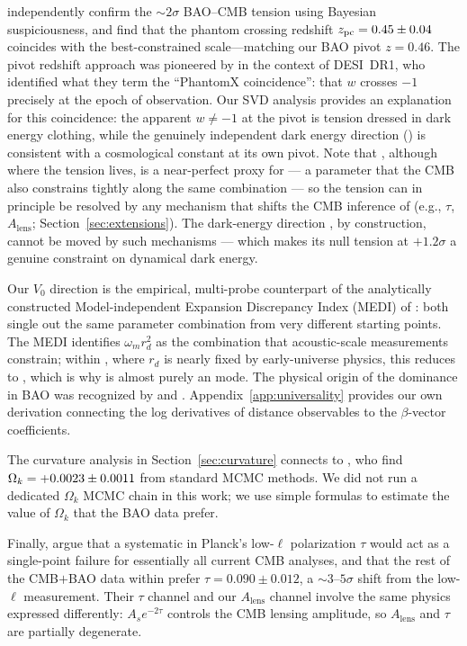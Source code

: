  
\citet{Ye2025} independently confirm the ${\sim}2\sigma$ BAO--CMB tension using Bayesian suspiciousness, and find that the phantom crossing redshift $z_{\rm pc} = 0.45 \pm 0.04$ coincides with the best-constrained scale---matching our BAO \cone pivot $z = 0.46$. The pivot redshift approach was pioneered by \citet{CortesLiddle2024} in the context of DESI~DR1, who identified what they term the ``PhantomX coincidence'': that $w$ crosses $-1$ precisely at the epoch of observation. Our SVD analysis provides an explanation for this coincidence: the apparent $w \neq -1$ at the \czero pivot is \omh tension dressed in dark energy clothing, while the genuinely independent dark energy direction (\cone) is consistent with a cosmological constant at its own pivot. Note that \czero, although where the tension lives, is a near-perfect proxy for \omh --- a parameter that the CMB also constrains tightly along the same combination --- so the tension can in principle be resolved by any mechanism that shifts the CMB inference of \omh (e.g., $\tau$, $A_\mathrm{lens}$; Section~\ref{sec:extensions}). The dark-energy direction \cone, by construction, cannot be moved by such mechanisms --- which makes its null tension at $+1.2\sigma$ a genuine constraint on dynamical dark energy.

Our $V_0$ direction is the empirical, multi-probe counterpart of the analytically constructed Model-independent Expansion Discrepancy Index (MEDI) of \citet{Weiner2026_MEDI}: both single out the same parameter combination from very different starting points. The MEDI identifies $\omega_m r_d^2$ as the combination that acoustic-scale measurements constrain; within \LCDM, where $r_d$ is nearly fixed by early-universe physics, this reduces to \omh, which is why \czero is almost purely an \omh mode. The physical origin of the \omh dominance in BAO was recognized by \citet{Eisenstein2004} and \citet{Knox2006}. Appendix~\ref{app:universality} provides our own derivation connecting the log derivatives of distance observables to the $\beta$-vector coefficients. 

The curvature analysis in Section~\ref{sec:curvature} connects to \citet{ChenZaldarriaga2025}, who find $\Omega_k = +0.0023 \pm 0.0011$ from standard MCMC methods. We did not run a dedicated $\Omega_k$ MCMC chain in this work; we use simple formulas to estimate the value of $\Omega_k$ that the BAO data prefer. 

Finally, \citet{Sailer2026} argue that a systematic in Planck's low-$\ell$ polarization $\tau$ would act as a single-point failure for essentially all current CMB analyses, and that the rest of the CMB$+$BAO data within \LCDM prefer $\tau = 0.090 \pm 0.012$, a $\sim 3$--$5\sigma$ shift from the low-$\ell$ measurement. Their $\tau$ channel and our $A_\mathrm{lens}$ channel involve the same physics expressed differently: $A_s e^{-2\tau}$ controls the CMB lensing amplitude, so $A_\mathrm{lens}$ and $\tau$ are partially degenerate. 

